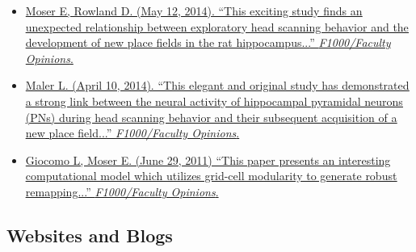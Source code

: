 \documentclass[10pt]{article}
\newcommand{\itemtitle}[1]{{\color{hopkinsblue}\ul{#1}}}
\begin{document}
\begin{itemize}
  \item \href{https://facultyopinions.com/prime/718333676#eval793494783}
    {Moser E, Rowland D. (May 12, 2014). ``\itemtitle{This exciting study finds
        an unexpected relationship between exploratory head scanning behavior
      and the development of new place fields in the rat hippocampus...}”
    \emph{F1000/Faculty Opinions}.}
  \item \href{https://facultyopinions.com/prime/718333676#eval793493493}
    {Maler L. (April 10, 2014). ``\itemtitle{This elegant and original study has
        demonstrated a strong link between the neural activity of hippocampal pyramidal
        neurons (PNs) during head scanning behavior and their subsequent acquisition of
    a new place field...}'' \emph{F1000/Faculty Opinions}.}
  \item \href{https://facultyopinions.com/prime/11553956}
    {Giocomo L, Moser E. (June 29, 2011) ``\itemtitle{This paper presents an
        interesting computational model which utilizes grid-cell modularity to generate
    robust remapping...}'' \emph{F1000/Faculty Opinions}.}
\end{itemize}

\subsection*{Websites and Blogs}
\end{document}
